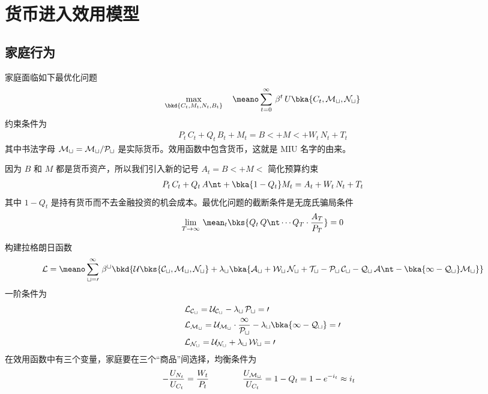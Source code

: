 \newpage
\section{货币进入效用模型}

\subsection{家庭行为}


家庭面临如下最优化问题
\begin{align*}
    \max_{\bkd{C_t,M_t,N_t,B_t}}\quad \meano\sum^\infty_{t=0}\,\beta^t\,U\bka{C_t, \cal{M_t},N_t}
\end{align*}
约束条件为
\begin{align*}
    P_t\,C_t+Q_t\,B_t+M_t=B\lt+M\lt+W_t\,N_t+T_t
\end{align*}
其中书法字母 \(\cal M_t=M_t/P_t\) 是实际货币。效用函数中包含货币，这就是 MIU 名字的由来。

因为 \(B\) 和 \(M\) 都是货币资产，所以我们引入新的记号 \(A_t=B\lt+M\lt\) 简化预算约束
\begin{align*}
    P_t\,C_t+Q_t\,A\nt+\bka{1-Q_t}M_t=A_t+W_t\,N_t+T_t
\end{align*}
其中 \(1-Q_t\) 是持有货币而不去金融投资的机会成本。最优化问题的截断条件是无庞氏骗局条件
\begin{align*}
    \lim_{T\to\infty}\,\mean_t\bks{Q_t\,Q\nt\cdots Q_T\cdot\dfrac{A_T}{P_T}}=0
\end{align*}

构建拉格朗日函数
\begin{align*}
    \cal L=\meano\sum^\infty_{t=0}\,\beta^t\bkd{U\bks{C_t, \cal{M_t},N_t}+\lambda_t\bka{A_t+W_t\,N_t+T_t-P_t\,C_t-Q_t\,A\nt-\bka{1-Q_t}M_t}}
\end{align*}
一阶条件为
\begin{align*}
    & \cal L_{C_t}=U_{C_t}-\lambda_t\,P_t=0\\
    & \cal L_{M_t}=U_{\cal M_t}\cdot\dfrac{1}{P_t}-\lambda_t\bka{1-Q_t}=0\\
    & \cal L_{N_t}=U_{N_t}+\lambda_t\,W_t=0
\end{align*}
在效用函数中有三个变量，家庭要在三个“商品”间选择，均衡条件为
\begin{align}
    -\dfrac{U_{N_t}}{U_{C_t}}=\dfrac{W_t}{P_t}\qquad\qquad
    \dfrac{U_{\cal M_t}}{U_{C_t}}&=1-Q_t=1-e^{-i_t}\approx i_t\label{eq:MIU-equilibrium}
\end{align}

